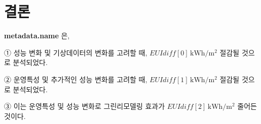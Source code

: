\documentclass[a4paper,10pt]{article}
\begin{document}
\section{결론}
\begin{tcolorbox}[colback=gray!5,colframe=black!60,boxrule=0.6pt,
                  left=4mm,right=4mm,top=2mm,bottom=2mm]
\textbf{ {{metadata.name}} }은,

① 성능 변화 및 기상데이터의 변화를 고려할 때, \underline{${{EUIdiff[0]}}\,\mathrm{kWh/m^2}$} 절감될 것으로 분석되었다.

② 운영특성 및 추가적인 성능 변화를 고려할 때, 
\underline{${{EUIdiff[1]}}\,\mathrm{kWh/m^2}$} 절감될 것으로 분석되었다. 

③ 이는 운영특성 및 성능 변화로 그린리모델링 효과가 
\underline{${{EUIdiff[2]}}\,\mathrm{kWh/m^2}$} 줄어든 것이다.
\end{tcolorbox}


\newpage
\end{document}
